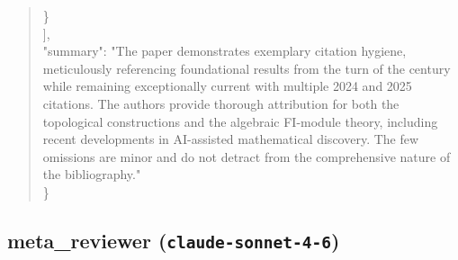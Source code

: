 \documentclass[11pt]{article}
\begin{document}
\begin{quote}
    \}\\
  ],\\
  "summary": "The paper demonstrates exemplary citation hygiene, meticulously referencing foundational results from the turn of the century while remaining exceptionally current with multiple 2024 and 2025 citations. The authors provide thorough attribution for both the topological constructions and the algebraic FI-module theory, including recent developments in AI-assisted mathematical discovery. The few omissions are minor and do not detract from the comprehensive nature of the bibliography."\\
\}\\
\end{quote}

\subsection*{meta\_reviewer (\texttt{claude-sonnet-4-6})}
\end{document}
